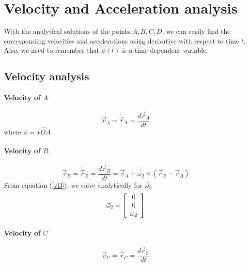 \section{Velocity and Acceleration analysis}
With the analytical solutions of the points $ A,B,C,D $, we can easily find the corresponding velocities and accelerations using derivative with respect to time $ t $. Also, we need to remember that $ \phi(t) $ is a time-dependent variable.
\subsection{Velocity analysis}
\paragraph{Velocity of $ A $}
\begin{equation}\label{vA}
\vec{v}_A=\dot{\vec{r}}_A=\dfrac{d\vec{r}_A}{dt}
\end{equation}
where $ \phi=\widehat{xOA} $
\paragraph{Velocity of $ B $}
\begin{equation}\label{vB}
\vec{v}_B=\dot{\vec{r}}_B=\dfrac{d\vec{r}_B}{dt}=\vec{v}_A+\vec{\omega}_2\times(\vec{r}_B-\vec{r}_A)
\end{equation}
From equation (\ref{vB}), we solve analytically for $ \vec{\omega}_2 $
\[\vec{\omega}_2=\left[ \begin{array}{c} 0\\ 0\\ \omega_2 \end{array}\right]\]
\paragraph{Velocity of $ C $}
\begin{equation}\label{vC}
\vec{v}_C=\dot{\vec{r}}_C=\dfrac{d\vec{r}_C}{dt}
\end{equation}
